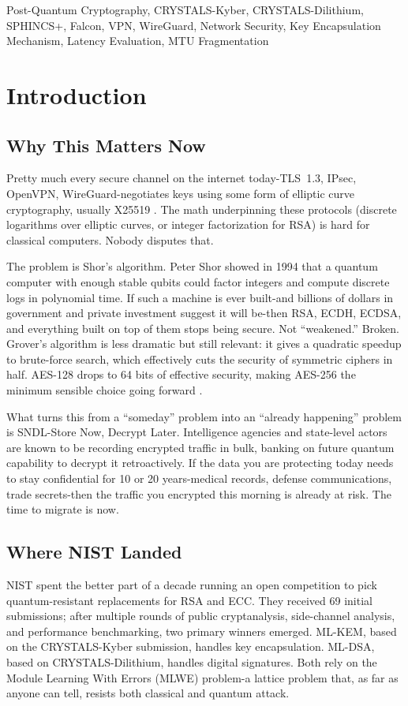\documentclass[10pt, conference, letterpaper]{IEEEtran}
\begin{document}
\begin{IEEEkeywords}
Post-Quantum Cryptography, CRYSTALS-Kyber, CRYSTALS-Dilithium, SPHINCS+, Falcon, VPN, WireGuard, Network Security, Key Encapsulation Mechanism, Latency Evaluation, MTU Fragmentation
\end{IEEEkeywords}

\section{Introduction}

\subsection{Why This Matters Now}
Pretty much every secure channel on the internet today-TLS~1.3, IPsec, OpenVPN, WireGuard-negotiates keys using some form of elliptic curve cryptography, usually X25519 \cite{hulsing2017pqwireguard}. The math underpinning these protocols (discrete logarithms over elliptic curves, or integer factorization for RSA) is hard for classical computers. Nobody disputes that.

The problem is Shor's algorithm. Peter Shor showed in 1994 that a quantum computer with enough stable qubits could factor integers and compute discrete logs in polynomial time. If such a machine is ever built-and billions of dollars in government and private investment suggest it will be-then RSA, ECDH, ECDSA, and everything built on top of them stops being secure. Not ``weakened.'' Broken. Grover's algorithm is less dramatic but still relevant: it gives a quadratic speedup to brute-force search, which effectively cuts the security of symmetric ciphers in half. AES-128 drops to 64 bits of effective security, making AES-256 the minimum sensible choice going forward \cite{shim2025qtrustnet}.

What turns this from a ``someday'' problem into an ``already happening'' problem is SNDL-Store Now, Decrypt Later. Intelligence agencies and state-level actors are known to be recording encrypted traffic in bulk, banking on future quantum capability to decrypt it retroactively. If the data you are protecting today needs to stay confidential for 10 or 20 years-medical records, defense communications, trade secrets-then the traffic you encrypted this morning is already at risk. The time to migrate is now.

\subsection{Where NIST Landed}
NIST spent the better part of a decade running an open competition to pick quantum-resistant replacements for RSA and ECC. They received 69 initial submissions; after multiple rounds of public cryptanalysis, side-channel analysis, and performance benchmarking, two primary winners emerged. ML-KEM, based on the CRYSTALS-Kyber submission, handles key encapsulation. ML-DSA, based on CRYSTALS-Dilithium, handles digital signatures. Both rely on the Module Learning With Errors (MLWE) problem-a lattice problem that, as far as anyone can tell, resists both classical and quantum attack.
\end{document}
